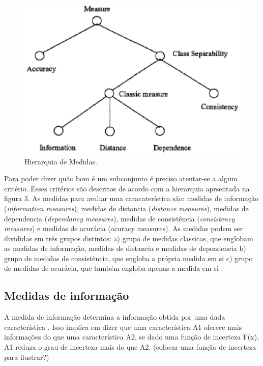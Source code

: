 \begin{figure}[h]
	\centering
	\label{fig04}
		\includegraphics[keepaspectratio=true,scale=1]{figuras/fig04.eps}
	\caption{Hierarquia de Medidas. \cite{huan_1998}}
\end{figure}

Para poder dizer quão bom é um subconjunto é preciso atentar-se a algum critério. Esses critérios são descritos de acordo com a hierarquia aprsentada na figura 3. As medidas para avaliar uma caracaterística são: medidas de informação (\textit{information measures}), medidas de distancia (\textit{distance measures}), medidas de dependencia (\textit{dependancy measures}), medidas de consistência (\textit{consistency measures}) e medidas de acurácia ({acuracy measures}). \cite{liu_2005, huan_1998} As medidas podem ser divididas em três grupos distintos: a) grupo de medidas classicas, que englobam as medidas de informação, medidas de distancia e medidas de dependencia b) grupo de medidas de consistência, que engloba a própria medida em si c) grupo de medidas de acurácia, que também engloba apenas a medida em si \cite{huan_1998}.

\subsection{Medidas de informação}

A medida de informação determina a informação obtida por uma dada característica \cite{liu_2005}. Isso implica em dizer que uma característica A1 oferece mais informações do que uma característica A2, se dado uma função de incerteza F(x), A1 reduza o grau de incerteza mais do que A2.  (colocar uma função de incerteza para ilustrar?) 

